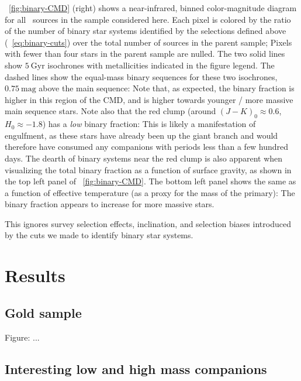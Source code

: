 \documentclass[modern]{aastex63}
\begin{document}
\figurename~\ref{fig:binary-CMD} (right) shows a near-infrared, binned
color-magnitude diagram for all \apogee\ sources in the sample considered here.
Each pixel is colored by the ratio of the number of binary star systems
identified by the selections defined above (\equationname~\ref{eq:binary-cuts})
over the total number of sources in the parent sample; Pixels with fewer than
four stars in the parent sample are nulled.
The two solid lines show $5~\mathrm{Gyr}$  isochrones \citep{MIST}
with metallicities indicated in the figure legend.
The dashed lines show the equal-mass binary sequences for these two isochrones,
$0.75~\mathrm{mag}$ above the main sequence: Note that, as expected, the binary
fraction is higher in this region of the CMD, and is higher towards younger /
more massive main sequence stars.
Note also that the red clump (around $(J-K)_0 \approx 0.6$, $H_0 \approx -1.8$)
has a \emph{low} binary fraction: This is likely a manifestation of engulfment,
as these stars have already been up the giant branch and would therefore have
consumed any companions with periods less than a few hundred days.
The dearth of binary systems near the red clump is also apparent when
visualizing the total binary fraction as a function of surface gravity, as shown
in the top left panel of \figurename~\ref{fig:binary-CMD}.
The bottom left panel shows the same as a function of effective temperature
(as a proxy for the mass of the primary): The binary fraction appears to
increase for more massive stars.

This ignores survey selection effects, inclination, and selection biases
introduced by the cuts we made to identify binary star systems.




\section{Results} \label{sec:results}

\subsection{Gold sample}

Figure: ...

\subsection{Interesting low and high mass companions}
\end{document}
